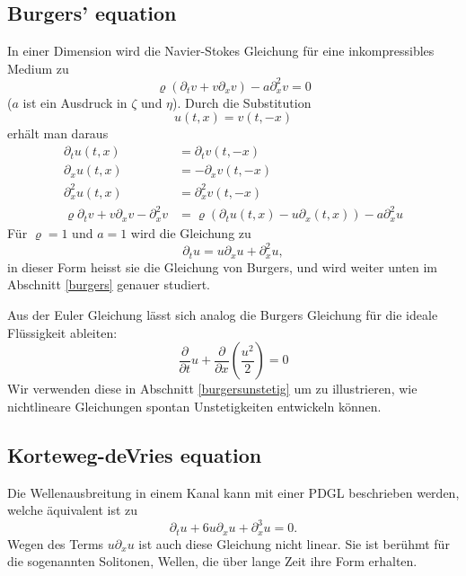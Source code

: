 \subsection{Burgers' equation}
In einer Dimension  wird die Navier-Stokes Gleichung für eine inkompressibles
Medium zu
\[
\varrho(\partial_t v+v\partial_x v)-a\partial_x^2v=0
\]
($a$ ist ein Ausdruck in $\zeta$ und $\eta$).
Durch die Substitution
\[
u(t,x)=v(t,-x)
\]
erhält man daraus 
\begin{align*}
\partial_tu(t,x)&=\partial_tv(t,-x)\\
\partial_xu(t,x)&=-\partial_xv(t,-x)\\
\partial_x^2u(t,x)&=\partial_x^2v(t,-x)\\
\varrho
\partial_t v+v\partial_x v-\partial_x^2v
&=
\varrho(\partial_tu(t,x)-u\partial_x(t,x))-a\partial_x^2u
\end{align*}
Für $\varrho=1$ und $a=1$ wird die Gleichung zu
\[
\partial_tu=u\partial_xu+\partial_x^2u,
\]
in dieser Form heisst sie die Gleichung von Burgers,
und wird weiter unten im Abschnitt
\ref{burgers} genauer studiert.

Aus der Euler Gleichung lässt sich analog die Burgers Gleichung
für die ideale Flüssigkeit ableiten:
\[
\frac{\partial}{\partial t}u+\frac{\partial}{\partial x}\left(\frac{u^2}2\right)
=0
\]
Wir verwenden diese in Abschnitt \ref{burgersunstetig} um zu illustrieren,
wie nichtlineare Gleichungen spontan Unstetigkeiten entwickeln können.

\subsection{Korteweg-deVries equation}
Die Wellenausbreitung in einem Kanal kann mit einer PDGL beschrieben werden,
welche äquivalent ist zu
\[
\partial_tu+6u\partial_xu+\partial_x^3u=0.
\]
Wegen des Terms $u\partial_xu$ ist auch diese Gleichung nicht linear.
Sie ist berühmt für die sogenannten Solitonen, Wellen, die über
lange Zeit ihre Form erhalten.

